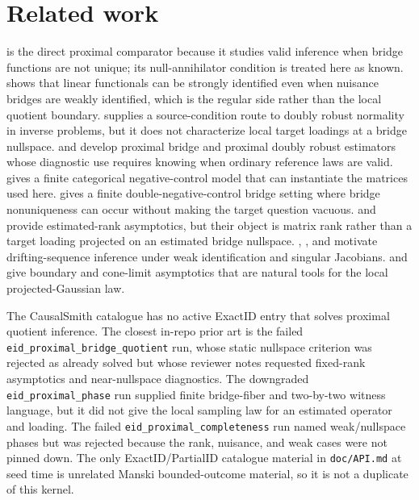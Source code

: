 \documentclass[11pt]{article}
\theoremstyle{definition}
\theoremstyle{plain}
\theoremstyle{remark}
\begin{document}
\section{Related work}
\citet[Sec. 2, Eq. (4)]{zhang2023proximalWithoutUniqueness} is the direct proximal comparator because it studies valid inference when bridge functions are not unique; its null-annihilator condition is treated here as known. \citet[Sec. 2, Thm. 1]{bennett2023stronglyIdentifiedFunctionals} shows that linear functionals can be strongly identified even when nuisance bridges are weakly identified, which is the regular side rather than the local quotient boundary. \citet{bennett2023sourceConditionDR} supplies a source-condition route to doubly robust normality in inverse problems, but it does not characterize local target loadings at a bridge nullspace. \citet{cui2024semiparametricProximal} and \citet{ying2023proximalPDR} develop proximal bridge and proximal doubly robust estimators whose diagnostic use requires knowing when ordinary reference laws are valid. \citet{shi2020multiplyRobustCategorical} gives a finite categorical negative-control model that can instantiate the matrices used here. \citet{miao2024confoundingBridgeDoubleNegativeControl} gives a finite double-negative-control bridge setting where bridge nonuniqueness can occur without making the target question vacuous. \citet[Sec. 2, Eq. (2.3)]{kleibergenPaap2006generalizedReducedRank} and \citet[Sec. 3]{robinSmith2000TestsRank} provide estimated-rank asymptotics, but their object is matrix rank rather than a target loading projected on an estimated bridge nullspace. \citet[Sec. 2, Assumption A]{andrewsCheng2012weakSemiStrongStrong}, \citet[Sec. 2]{andrewsCheng2014gmmIdentificationFailure}, and \citet[Sec. 2, Assumption 2.1]{hanMcCloskey2019nearlySingularJacobian} motivate drifting-sequence inference under weak identification and singular Jacobians. \citet{andrews1999EstimationBoundary} and \citet{drton2009LikelihoodRatioSingularities} give boundary and cone-limit asymptotics that are natural tools for the local projected-Gaussian law.

The CausalSmith catalogue has no active ExactID entry that solves proximal quotient inference. The closest in-repo prior art is the failed \texttt{eid\_proximal\_bridge\_quotient} run, whose static nullspace criterion was rejected as already solved but whose reviewer notes requested fixed-rank asymptotics and near-nullspace diagnostics. The downgraded \texttt{eid\_proximal\_phase} run supplied finite bridge-fiber and two-by-two witness language, but it did not give the local sampling law for an estimated operator and loading. The failed \texttt{eid\_proximal\_completeness} run named weak/nullspace phases but was rejected because the rank, nuisance, and weak cases were not pinned down. The only ExactID/PartialID catalogue material in \texttt{doc/API.md} at seed time is unrelated Manski bounded-outcome material, so it is not a duplicate of this kernel.
\end{document}
